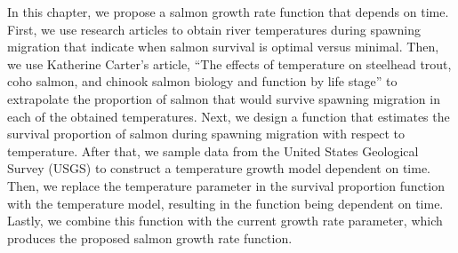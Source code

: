 In this chapter, we propose a salmon growth rate function that depends on time.
First, we use research articles to obtain river temperatures during spawning migration that indicate when salmon survival is optimal versus minimal.
Then, we use Katherine Carter's article, ``The effects of temperature on steelhead trout, coho salmon, and chinook salmon biology and function by life stage'' to extrapolate the proportion of salmon that would survive spawning migration in each of the obtained temperatures.
Next, we design a function that estimates the survival proportion of salmon during spawning migration with respect to temperature.
After that, we sample data from the United States Geological Survey (USGS) to construct a temperature growth model dependent on time.
Then, we replace the temperature parameter in the survival proportion function with the temperature model, resulting in the function being dependent on time.
Lastly, we combine this function with the current growth rate parameter, which produces the proposed salmon growth rate function.


